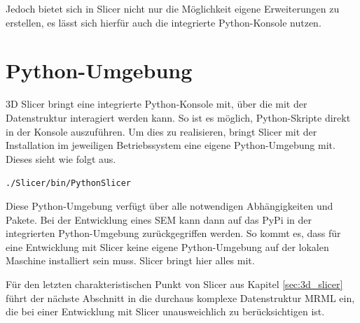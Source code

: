 Jedoch bietet sich in Slicer nicht nur die Möglichkeit eigene Erweiterungen zu
erstellen, es lässt sich hierfür auch die integrierte Python-Konsole nutzen.

\section{Python-Umgebung}
\label{subsec:pythob_umgebung} 3D Slicer bringt eine integrierte Python-Konsole mit,
über die mit der Datenstruktur interagiert werden kann. So ist es möglich,
Python-Skripte direkt in der Konsole auszuführen. Um dies zu realisieren, bringt
Slicer mit der Installation im jeweiligen Betriebssystem eine eigene Python-Umgebung
mit. Dieses sieht wie folgt aus.

\begin{center}
	\texttt{./Slicer/bin/PythonSlicer}
\end{center}

Diese Python-Umgebung verfügt über alle notwendigen Abhängigkeiten und Pakete. Bei
der Entwicklung eines \ac{SEM} kann dann auf das \ac{PyPi} in der integrierten Python-Umgebung
zurückgegriffen werden. So kommt es, dass für eine Entwicklung mit Slicer keine eigene
Python-Umgebung auf der lokalen Maschine installiert sein muss. Slicer bringt
hier alles mit.

Für den letzten charakteristischen Punkt von Slicer aus Kapitel
\ref{sec:3d_slicer} führt der nächste Abschnitt in die durchaus komplexe
Datenstruktur \ac{MRML} ein, die bei einer Entwicklung mit Slicer unausweichlich
zu berücksichtigen ist.


